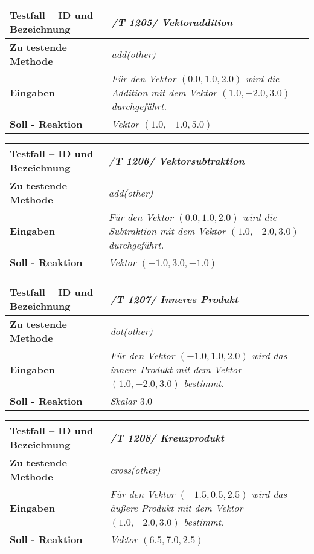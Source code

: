 \begin{longtable}{|p{7cm}|p{10cm}|}
\hline
\textbf{Testfall -- ID und Bezeichnung} & \textit{ /T 1205/ Vektoraddition} \\
\hline
\textbf{Zu testende Methode} &  \textit{add(other)} \\
\hline
\textbf{Eingaben} & \textit{Für den Vektor  $(0.0, 1.0, 2.0)$ wird die Addition mit
dem Vektor  $(1.0, -2.0, 3.0)$ durchgeführt.}\\
\hline
\textbf{Soll - Reaktion} & \textit{Vektor $(1.0, -1.0, 5.0)$} \\
\hline
\end{longtable}

\begin{longtable}{|p{7cm}|p{10cm}|}
\hline
\textbf{Testfall -- ID und Bezeichnung} & \textit{ /T 1206/ Vektorsubtraktion} \\
\hline
\textbf{Zu testende Methode} &  \textit{add(other)} \\
\hline
\textbf{Eingaben} & \textit{Für den Vektor  $(0.0, 1.0, 2.0)$ wird die Subtraktion mit
dem Vektor $(1.0, -2.0, 3.0)$ durchgeführt.}\\
\hline
\textbf{Soll - Reaktion} & \textit{Vektor $(-1.0, 3.0, -1.0)$} \\
\hline
\end{longtable}


\begin{longtable}{|p{7cm}|p{10cm}|}
\hline
\textbf{Testfall -- ID und Bezeichnung} & \textit{ /T 1207/ Inneres Produkt} \\
\hline
\textbf{Zu testende Methode} &  \textit{dot(other)} \\
\hline
\textbf{Eingaben} & \textit{Für den Vektor  $(-1.0, 1.0, 2.0)$ wird das innere Produkt mit
dem Vektor $(1.0, -2.0, 3.0)$ bestimmt.}\\
\hline
\textbf{Soll - Reaktion} & \textit{Skalar $3.0$} \\
\hline
\end{longtable}

\begin{longtable}{|p{7cm}|p{10cm}|}
\hline
\textbf{Testfall -- ID und Bezeichnung} & \textit{ /T 1208/ Kreuzprodukt} \\
\hline
\textbf{Zu testende Methode} &  \textit{cross(other)} \\
\hline
\textbf{Eingaben} & \textit{Für den Vektor  $(-1.5, 0.5, 2.5)$ wird das äußere Produkt
mit dem Vektor $(1.0, -2.0, 3.0)$ bestimmt.}\\
\hline
\textbf{Soll - Reaktion} & \textit{Vektor $(6.5, 7.0, 2.5)$} \\
\hline
\end{longtable}

